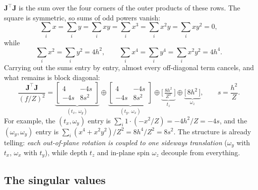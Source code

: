 \documentclass[11pt,a4paper]{article}
\theoremstyle{remark}
\newcommand{\Jmat}{\mathbf{J}}
\begin{document}
$\Jmat^{\top}\Jmat$ is the sum over the four corners of the outer products of
these rows. The square is symmetric, so sums of odd powers vanish:
\begin{equation}
  \sum_i x = \sum_i y = \sum_i xy = \sum_i x^3 = \sum_i x^2 y
  = \sum_i x y^2 = 0,
\end{equation}
while
\begin{equation}
  \sum_i x^2 = \sum_i y^2 = 4h^2,
  \qquad
  \sum_i x^4 = \sum_i y^4 = \sum_i x^2y^2 = 4h^4 .
\end{equation}
Carrying out the sums entry by entry, almost every off-diagonal term cancels,
and what remains is block diagonal:
\begin{equation}
  \frac{\Jmat^{\top}\Jmat}{(f/Z)^2}
  =
  \underbrace{\begin{bmatrix} 4 & -4s \\ -4s & 8s^2 \end{bmatrix}}
    _{(t_x,\ \omega_y)}
  \oplus
  \underbrace{\begin{bmatrix} 4 & -4s \\ -4s & 8s^2 \end{bmatrix}}
    _{(t_y,\ \omega_x)}
  \oplus
  \underbrace{\Big[\,\tfrac{8h^2}{Z^2}\,\Big]}_{t_z}
  \oplus
  \underbrace{\big[\,8h^2\,\big]}_{\omega_z},
  \qquad
  s = \frac{h^2}{Z}.
  \label{eq:blocks}
\end{equation}
For example, the $(t_x,\omega_y)$ entry is $\sum_i 1\cdot(-x^2/Z) = -4h^2/Z =
-4s$, and the $(\omega_y,\omega_y)$ entry is $\sum_i (x^4 + x^2y^2)/Z^2 =
8h^4/Z^2 = 8s^2$. The structure is already telling: \emph{each out-of-plane
rotation is coupled to one sideways translation} ($\omega_y$ with $t_x$,
$\omega_x$ with $t_y$), while depth $t_z$ and in-plane spin $\omega_z$ decouple
from everything.

\subsection{The singular values}
\end{document}
